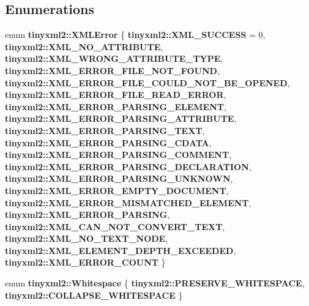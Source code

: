\subsection*{Enumerations}
\begin{DoxyCompactItemize}
\item 
enum \textbf{ tinyxml2\+::\+X\+M\+L\+Error} \{ \newline
\textbf{ tinyxml2\+::\+X\+M\+L\+\_\+\+S\+U\+C\+C\+E\+SS} = 0, 
\textbf{ tinyxml2\+::\+X\+M\+L\+\_\+\+N\+O\+\_\+\+A\+T\+T\+R\+I\+B\+U\+TE}, 
\textbf{ tinyxml2\+::\+X\+M\+L\+\_\+\+W\+R\+O\+N\+G\+\_\+\+A\+T\+T\+R\+I\+B\+U\+T\+E\+\_\+\+T\+Y\+PE}, 
\textbf{ tinyxml2\+::\+X\+M\+L\+\_\+\+E\+R\+R\+O\+R\+\_\+\+F\+I\+L\+E\+\_\+\+N\+O\+T\+\_\+\+F\+O\+U\+ND}, 
\newline
\textbf{ tinyxml2\+::\+X\+M\+L\+\_\+\+E\+R\+R\+O\+R\+\_\+\+F\+I\+L\+E\+\_\+\+C\+O\+U\+L\+D\+\_\+\+N\+O\+T\+\_\+\+B\+E\+\_\+\+O\+P\+E\+N\+ED}, 
\textbf{ tinyxml2\+::\+X\+M\+L\+\_\+\+E\+R\+R\+O\+R\+\_\+\+F\+I\+L\+E\+\_\+\+R\+E\+A\+D\+\_\+\+E\+R\+R\+OR}, 
\textbf{ tinyxml2\+::\+X\+M\+L\+\_\+\+E\+R\+R\+O\+R\+\_\+\+P\+A\+R\+S\+I\+N\+G\+\_\+\+E\+L\+E\+M\+E\+NT}, 
\textbf{ tinyxml2\+::\+X\+M\+L\+\_\+\+E\+R\+R\+O\+R\+\_\+\+P\+A\+R\+S\+I\+N\+G\+\_\+\+A\+T\+T\+R\+I\+B\+U\+TE}, 
\newline
\textbf{ tinyxml2\+::\+X\+M\+L\+\_\+\+E\+R\+R\+O\+R\+\_\+\+P\+A\+R\+S\+I\+N\+G\+\_\+\+T\+E\+XT}, 
\textbf{ tinyxml2\+::\+X\+M\+L\+\_\+\+E\+R\+R\+O\+R\+\_\+\+P\+A\+R\+S\+I\+N\+G\+\_\+\+C\+D\+A\+TA}, 
\textbf{ tinyxml2\+::\+X\+M\+L\+\_\+\+E\+R\+R\+O\+R\+\_\+\+P\+A\+R\+S\+I\+N\+G\+\_\+\+C\+O\+M\+M\+E\+NT}, 
\textbf{ tinyxml2\+::\+X\+M\+L\+\_\+\+E\+R\+R\+O\+R\+\_\+\+P\+A\+R\+S\+I\+N\+G\+\_\+\+D\+E\+C\+L\+A\+R\+A\+T\+I\+ON}, 
\newline
\textbf{ tinyxml2\+::\+X\+M\+L\+\_\+\+E\+R\+R\+O\+R\+\_\+\+P\+A\+R\+S\+I\+N\+G\+\_\+\+U\+N\+K\+N\+O\+WN}, 
\textbf{ tinyxml2\+::\+X\+M\+L\+\_\+\+E\+R\+R\+O\+R\+\_\+\+E\+M\+P\+T\+Y\+\_\+\+D\+O\+C\+U\+M\+E\+NT}, 
\textbf{ tinyxml2\+::\+X\+M\+L\+\_\+\+E\+R\+R\+O\+R\+\_\+\+M\+I\+S\+M\+A\+T\+C\+H\+E\+D\+\_\+\+E\+L\+E\+M\+E\+NT}, 
\textbf{ tinyxml2\+::\+X\+M\+L\+\_\+\+E\+R\+R\+O\+R\+\_\+\+P\+A\+R\+S\+I\+NG}, 
\newline
\textbf{ tinyxml2\+::\+X\+M\+L\+\_\+\+C\+A\+N\+\_\+\+N\+O\+T\+\_\+\+C\+O\+N\+V\+E\+R\+T\+\_\+\+T\+E\+XT}, 
\textbf{ tinyxml2\+::\+X\+M\+L\+\_\+\+N\+O\+\_\+\+T\+E\+X\+T\+\_\+\+N\+O\+DE}, 
\textbf{ tinyxml2\+::\+X\+M\+L\+\_\+\+E\+L\+E\+M\+E\+N\+T\+\_\+\+D\+E\+P\+T\+H\+\_\+\+E\+X\+C\+E\+E\+D\+ED}, 
\textbf{ tinyxml2\+::\+X\+M\+L\+\_\+\+E\+R\+R\+O\+R\+\_\+\+C\+O\+U\+NT}
 \}
\item 
enum \textbf{ tinyxml2\+::\+Whitespace} \{ \textbf{ tinyxml2\+::\+P\+R\+E\+S\+E\+R\+V\+E\+\_\+\+W\+H\+I\+T\+E\+S\+P\+A\+CE}, 
\textbf{ tinyxml2\+::\+C\+O\+L\+L\+A\+P\+S\+E\+\_\+\+W\+H\+I\+T\+E\+S\+P\+A\+CE}
 \}
\end{DoxyCompactItemize}
